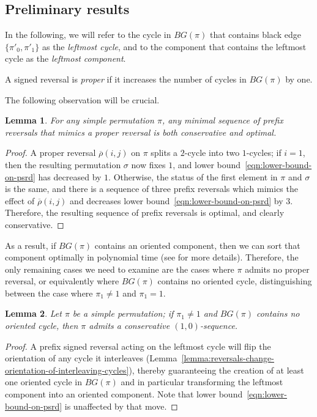 \documentclass[review]{elsarticle}
\newtheorem{lemma}{Lemma}
\begin{document}
\subsection{Preliminary results}

In the following, we will refer to the cycle in $BG(\pi)$ that contains black edge $\{\pi'_0, \pi'_1\}$ as the \emph{leftmost cycle}, and to the component that contains the leftmost cycle as the \emph{leftmost component}.

\begin{definition}
A signed reversal is \emph{proper} if it increases the number of cycles in $BG(\pi)$ by one.
\end{definition}

The following observation will be crucial.

\begin{lemma}\label{lemma:mimicking-proper-reversals-is-optimal-for-simple-permutations}
For any simple permutation $\pi$, any minimal sequence of prefix reversals that mimics a proper reversal is both conservative and optimal.
\end{lemma}
\begin{proof}
A proper reversal $\overline{\rho}(i,j)$ on $\pi$ splits a $2$-cycle into two $1$-cycles; if $i=1$, then the resulting permutation $\sigma$ now fixes $1$, and lower bound~\eqref{eqn:lower-bound-on-psrd} has decreased by $1$. Otherwise, the status of the first element in $\pi$ and $\sigma$ is the same, and there is a sequence of three prefix reversals which mimics the effect of $\overline{\rho}(i,j)$
and decreases lower bound~\eqref{eqn:lower-bound-on-psrd} by $3$. Therefore, the resulting sequence of prefix reversals is optimal, and clearly conservative.
\end{proof}

As a result, if $BG(\pi)$ contains an oriented component, then we can sort that component optimally in polynomial time (see \citet{tannier-advances} for more details). Therefore, the only remaining cases we need to examine are the cases where $\pi$ admits no proper reversal, or equivalently where $BG(\pi)$ contains no oriented cycle, distinguishing between the case where $\pi_1\neq 1$ and $\pi_1=1$.

\begin{lemma}\label{lemma:simple-permutation-leftmost-component-is-a-hurdle}
Let $\pi$ be a simple permutation; if $\pi_1\neq 1$ and $BG(\pi)$ contains no oriented cycle, then $\pi$ admits a conservative $(1,0)$-sequence.
\end{lemma}
\begin{proof}
A prefix signed reversal acting on the leftmost cycle will flip the orientation of any cycle it interleaves (Lemma~\ref{lemma:reversals-change-orientation-of-interleaving-cycles}), thereby guaranteeing the creation of at least one oriented cycle in $BG(\pi)$ and in particular transforming the leftmost component into an oriented component. Note that lower bound~\eqref{eqn:lower-bound-on-psrd} is unaffected by that move.
\end{proof}
\end{document}
